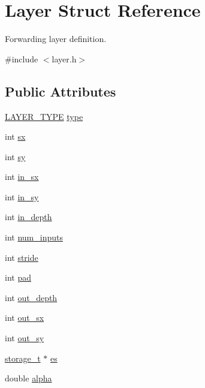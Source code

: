 \hypertarget{structLayer}{}\section{Layer Struct Reference}
\label{structLayer}


Forwarding layer definition.  




{\ttfamily \#include $<$layer.\+h$>$}

\subsection*{Public Attributes}
\begin{DoxyCompactItemize}
\item 
\hyperlink{layer_8h_a5f7e99058765b058df158c099200b154}{L\+A\+Y\+E\+R\+\_\+\+T\+Y\+PE} \hyperlink{structLayer_a4179463433524fb5ef7624f85d80241b}{type}
\item 
int \hyperlink{structLayer_a55c6cca33bde137cd47294fdb86c9ec3}{sx}
\item 
int \hyperlink{structLayer_a9852ef0522fef2248a0e8e0be2a5f7af}{sy}
\item 
int \hyperlink{structLayer_ae4b3280c4ba2b29c7ddc9ba9e834ad3b}{in\+\_\+sx}
\item 
int \hyperlink{structLayer_ac46fb025649047fafb2cb8206f954f31}{in\+\_\+sy}
\item 
int \hyperlink{structLayer_aeb96f45b8f41e8f9c7fa682110755339}{in\+\_\+depth}
\item 
int \hyperlink{structLayer_ad9bc3c0e21161b03f604272605d8fffd}{num\+\_\+inputs}
\item 
int \hyperlink{structLayer_a2a7d5301da0ed82b8d68b3400856ee00}{stride}
\item 
int \hyperlink{structLayer_a188060ee891fc16630afb232b86d4d39}{pad}
\item 
int \hyperlink{structLayer_ad9871ba11cc56d38fdc754269d1dd551}{out\+\_\+depth}
\item 
int \hyperlink{structLayer_ac5003227f797ca48500d217d574a6c4a}{out\+\_\+sx}
\item 
int \hyperlink{structLayer_aec5ede8f8a6236e9c64bce289e1a63c3}{out\+\_\+sy}
\item 
\hyperlink{setting_8h_a3529be440b2ef96493a3e8c22fcfcecc}{storage\+\_\+t} $\ast$ \hyperlink{structLayer_aa22466959721de60fac4e0ba73a5f5e1}{es}
\item 
double \hyperlink{structLayer_a4d732673af28831874e279bdfaf7c44d}{alpha}
\item 

\end{DoxyCompactItemize}
